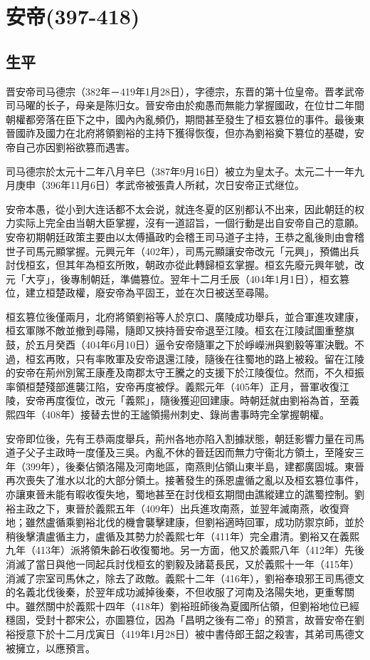
\section{安帝\tiny(397-418)}

\subsection{生平}

晋安帝司马德宗（382年－419年1月28日），字德宗，东晋的第十位皇帝。晋孝武帝司马曜的长子，母亲是陈归女。晉安帝由於痴愚而無能力掌握國政，在位廿二年間朝權都旁落在臣下之中，國內內亂頻仍，期間甚至發生了桓玄篡位的事件。最後東晉國祚及國力在北府將領劉裕的主持下獲得恢復，但亦為劉裕奠下篡位的基礎，安帝自己亦因劉裕欲篡而遇害。

司马德宗於太元十二年八月辛巳（387年9月16日）被立为皇太子。太元二十一年九月庚申（396年11月6日）孝武帝被張貴人所弒，次日安帝正式继位。

安帝本愚，從小到大连话都不太会说，就连冬夏的区别都认不出来，因此朝廷的权力实际上完全由当朝大臣掌握，沒有一道詔旨，一個行動是出自安帝自己的意願。安帝初期朝廷政策主要由以太傅攝政旳会稽王司马道子主持，王恭之亂後則由會稽世子司馬元顯掌握。元興元年（402年），司馬元顯讓安帝改元「元興」，預備出兵討伐桓玄，但其年為桓玄所敗，朝政亦從此轉歸桓玄掌握。桓玄先廢元興年號，改元「大亨」，後專制朝廷，準備篡位。翌年十二月壬辰（404年1月1日），桓玄篡位，建立桓楚政權，廢安帝為平固王，並在次日被送至尋陽。

桓玄篡位後僅兩月，北府將領劉裕等人於京口、廣陵成功舉兵，並合軍進攻建康，桓玄軍隊不敵並撤到尋陽，隨即又挾持晉安帝退至江陵。桓玄在江陵試圖重整旗鼓，於五月癸酉（404年6月10日）逼令安帝隨軍之下於崢嶸洲與劉毅等軍決戰。不過，桓玄再敗，只有率敗軍及安帝退還江陵，隨後在往蜀地的路上被殺。留在江陵的安帝在荊州別駕王康產及南郡太守王騰之的支援下於江陵復位。然而，不久桓振率領桓楚殘部進襲江陷，安帝再度被俘。義熙元年（405年）正月，晉軍收復江陵，安帝再度復位，改元「義熙」，隨後獲迎回建康。時朝廷就由劉裕為首，至義熙四年（408年）接替去世的王謐領揚州刺史、錄尚書事時完全掌握朝權。

安帝即位後，先有王恭兩度舉兵，荊州各地亦陷入割據狀態，朝廷影響力量在司馬道子父子主政時一度僅及三吳。內亂不休的晉廷因而無力守衞北方領土，至隆安三年（399年），後秦佔領洛陽及河南地區，南燕則佔領山東半島，建都廣固城。東晉再次喪失了淮水以北的大部分領土。接著發生的孫恩盧循之亂以及桓玄篡位事件，亦讓東晉未能有暇收復失地，蜀地甚至在討伐桓玄期間由譙縱建立的譙蜀控制。劉裕主政之下，東晉於義熙五年（409年）出兵進攻南燕，並翌年滅南燕，收復齊地；雖然盧循乘劉裕北伐的機會襲擊建康，但劉裕適時回軍，成功防禦京師，並於稍後擊潰盧循主力，盧循及其勢力於義熙七年（411年）完全肅清。劉裕又在義熙九年（413年）派將領朱齡石收復蜀地。另一方面，他又於義熙八年（412年）先後消滅了當日與他一同起兵討伐桓玄的劉毅及諸葛長民，又於義熙十一年（415年）消滅了宗室司馬休之，除去了政敵。義熙十二年（416年），劉裕奉琅邪王司馬德文的名義北伐後秦，於翌年成功滅掉後秦，不但收服了河南及洛陽失地，更重奪關中。雖然關中於義熙十四年（418年）劉裕班師後為夏國所佔領，但劉裕地位已經穩固，受封十郡宋公，亦圖篡位，因為「昌明之後有二帝」的預言，故晉安帝在劉裕授意下於十二月戊寅日（419年1月28日）被中書侍郎王韶之殺害，其弟司馬德文被擁立，以應預言。

